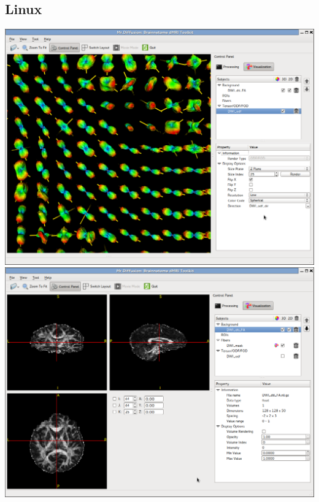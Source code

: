 \documentclass[letterpaper,10pt,english]{sphinxmanual}
\begin{document}
\subsection{Linux}
\label{screenshot:linux}
\includegraphics{sticks.png} \includegraphics{slices.png}
\end{document}
